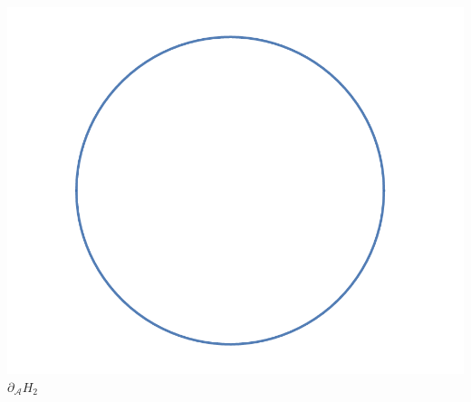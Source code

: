 \documentclass[12pt]{article}
\newcommand{\cA}{{\mathcal A}}
\theoremstyle{definition}
\begin{document}
\begin{enumerate}
\begin{center}
				\includegraphics[scale = 0.4]{D H_0.png}\\
				$\partial_\cA H_2$
		  \end{center}
\end{enumerate}
\end{document}
